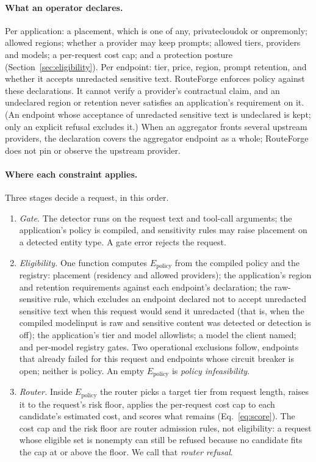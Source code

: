 \documentclass[11pt]{article}
\newcommand{\ubreak}{\textunderscore\allowbreak}
\newcommand{\code}[1]{{\ttfamily\let\_\ubreak #1}}
\begin{document}
\paragraph{What an operator declares.} Per application: a placement, which is one
of \code{any}, \code{private\_cloud\_ok} or \code{onprem\_only}; allowed regions; whether a
provider may keep prompts; allowed tiers, providers and models; a per-request cost cap; and a
protection posture (Section~\ref{sec:eligibility}). Per endpoint: tier, price, region, prompt
retention, and whether it accepts unredacted sensitive text. RouteForge enforces policy against
these declarations. It cannot verify a provider's contractual claim, and an undeclared region or
retention never satisfies an application's requirement on it. (An endpoint whose acceptance of
unredacted sensitive text is undeclared is kept; only an explicit refusal excludes it.) When an
aggregator fronts several upstream providers, the declaration covers the aggregator endpoint as
a whole; RouteForge does not pin or observe the upstream provider.

\paragraph{Where each constraint applies.} Three stages decide a request, in this order.
\begin{enumerate}
  \item \emph{Gate.} The detector runs on the request text and tool-call arguments; the
    application's policy is compiled, and sensitivity rules may raise placement on a detected
    entity type. A gate error rejects the request.
  \item \emph{Eligibility.} One function computes $E_{\mathrm{policy}}$ from the compiled policy
    and the registry: placement (residency and allowed providers); the application's region and
    retention requirements against each endpoint's declaration; the raw-sensitive rule, which
    excludes an endpoint declared not to accept unredacted sensitive text when this request
    would send it unredacted (that is, when the compiled \code{model\_input} is \code{raw} and
    sensitive content was detected or detection is off); the application's tier and model
    allowlists; a model the client named; and per-model registry gates. Two operational
    exclusions follow, endpoints that already failed for this request and endpoints whose
    circuit breaker is open; neither is policy. An empty $E_{\mathrm{policy}}$ is \emph{policy
    infeasibility}.
  \item \emph{Router.} Inside $E_{\mathrm{policy}}$ the router picks a target tier from request
    length, raises it to the request's risk floor, applies the per-request cost cap to each
    candidate's estimated cost, and scores what remains (Eq.~\eqref{eq:score}). The cost cap and
    the risk floor are router admission rules, not eligibility: a request whose eligible set is
    nonempty can still be refused because no candidate fits the cap at or above the floor. We
    call that \emph{router refusal}.
\end{enumerate}
\end{document}
